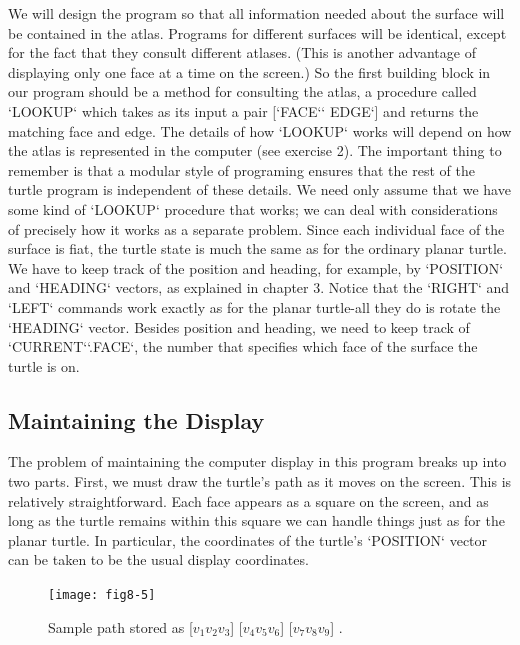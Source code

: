 \documentclass{book}
\begin{document}
We will design the program so that all information needed about the
surface will be contained in the atlas. Programs for different surfaces
will be identical, except for the fact that they consult different atlases.
(This is another advantage of displaying only one face at a time on the
screen.) So the first building block in our program should be a method
for consulting the atlas, a procedure called \textsc{`LOOKUP`} which takes as its
input a pair [\textsc{`FACE`}\textsc{` EDGE`}] and returns the matching face and edge. The
details of how \textsc{`LOOKUP`} works will depend on how the atlas is represented
in the computer (see exercise 2). The important thing to remember is
that a modular style of programing ensures that the rest of the turtle
program is independent of these details. We need only assume that
we have some kind of \textsc{`LOOKUP`} procedure that works; we can deal with
considerations of precisely how it works as a separate problem.
Since each individual face of the surface is fiat, the turtle state is much
the same as for the ordinary planar turtle. We have to keep track of the
position and heading, for example, by \textsc{`POSITION`} and \textsc{`HEADING`} vectors, as
explained in chapter 3. Notice that the \textsc{`RIGHT`} and \textsc{`LEFT`} commands work
exactly as for the planar turtle-all they do is rotate the \textsc{`HEADING`} vector.
Besides position and heading, we need to keep track of \textsc{`CURRENT`}\textsc{`.FACE`},
the number that specifies which face of the surface the turtle is on.

\subsection{Maintaining the Display}

The problem of maintaining the computer display in this program breaks
up into two parts. First, we must draw the turtle's path as it moves
on the screen. This is relatively straightforward. Each face appears as
a square on the screen, and as long as the turtle remains within this
square we can handle things just as for the planar turtle. In particular,
the coordinates of the turtle's \textsc{`POSITION`} vector can be taken to be the
usual display coordinates.

\begin{figure}
\begin{center}
\texttt{[image: fig8-5]}
\caption{Sample path stored as [$v_1 v_2 v_3$] [$v_4 v_5 v_6$] [$v_7 v_8 v_9$] .}
\end{center}
\end{figure}
\end{document}
